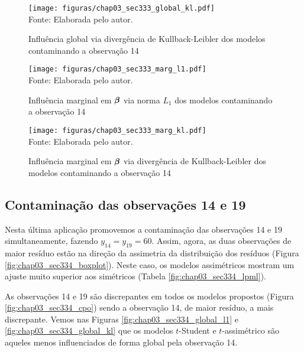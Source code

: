 \newpage
\begin{figure}[!h]
\begin{center}
\caption{Influência global via divergência de Kullback-Leibler dos modelos contaminando a observação 14}
\label{fig:chap03_sec333_global_kl}
\texttt{[image: figuras/chap03\_sec333\_global\_kl.pdf]}
\\ Fonte: Elaborada pelo autor.
\end{center}
\end{figure}

\newpage
\begin{figure}[!h]
\begin{center}
\caption{Influência marginal em ${\boldsymbol{\beta}}$ via norma $L_1$ dos modelos contaminando a observação 14}
\label{fig:chap03_sec333_marg_l1}
\texttt{[image: figuras/chap03\_sec333\_marg\_l1.pdf]}
\\ Fonte: Elaborada pelo autor.
\end{center}
\end{figure}

\begin{figure}[H]
\begin{center}
\caption{Influência marginal em ${\boldsymbol{\beta}}$ via divergência de Kullback-Leibler dos modelos contaminando a observação 14}
\label{fig:chap03_sec333_marg_kl}
\texttt{[image: figuras/chap03\_sec333\_marg\_kl.pdf]}
\\ Fonte: Elaborada pelo autor.
\end{center}
\end{figure}
\subsection{Contaminação das observações 14 e 19}

Nesta última aplicação promovemos a contaminação das observações 14 e 19 simultaneamente, fazendo $y_{14}=y_{19}=60$. Assim, agora, as duas observações de maior resíduo estão na direção da assimetria da distribuição dos resíduos (Figura \ref{fig:chap03_sec334_boxplot}). Neste caso, os modelos assimétricos mostram um ajuste muito superior aos simétricos (Tabela \ref{fig:chap03_sec334_lpml}).

As observações 14 e 19 são discrepantes em todos os modelos propostos (Figura \ref{fig:chap03_sec334_cpo}) sendo a observação 14, de maior resíduo, a mais discrepante. Vemos nas Figuras \ref{fig:chap03_sec334_global_l1} e \ref{fig:chap03_sec334_global_kl} que os modelos $t$-Student e $t$-assimétrico são aqueles menos influenciados de forma global pela observação 14.

